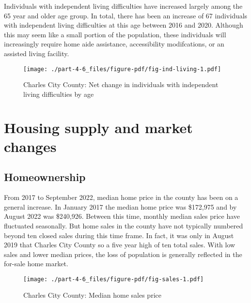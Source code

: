 \documentclass[
  letterpaper,
  DIV=11,
  numbers=noendperiod]{scrreprt}
\begin{document}
Individuals with independent living difficulties have increased largely
among the 65 year and older age group. In total, there has been an
increase of 67 individuals with independent living difficulties at this
age between 2016 and 2020. Although this may seem like a small portion
of the population, these individuals will increasingly require home aide
assistance, accessibility modifcations, or an assisted living facility.

\begin{figure}

{\centering \texttt{[image: ./part-4-6\_files/figure-pdf/fig-ind-living-1.pdf]}

}

\caption{\label{fig-ind-living}Charles City County: Net change in
individuals with independent living difficulties by age}

\end{figure}

\hypertarget{housing-supply-and-market-changes-5}{%
\section{Housing supply and market
changes}\label{housing-supply-and-market-changes-5}}

\hypertarget{homeownership-5}{%
\subsection{Homeownership}\label{homeownership-5}}

From 2017 to September 2022, median home price in the county has been on
a general increase. In January 2017 the median home price was \$172,975
and by August 2022 was \$240,926. Between this time, monthly median
sales price have fluctuated seasonally. But home sales in the county
have not typically numbered beyond ten closed sales during this time
frame. In fact, it was only in August 2019 that Charles City County so a
five year high of ten total sales. With low sales and lower median
prices, the loss of population is generally reflected in the for-sale
home market.

\begin{figure}

{\centering \texttt{[image: ./part-4-6\_files/figure-pdf/fig-sales-1.pdf]}

}

\caption{\label{fig-sales}Charles City County: Median home sales price}

\end{figure}
\end{document}
